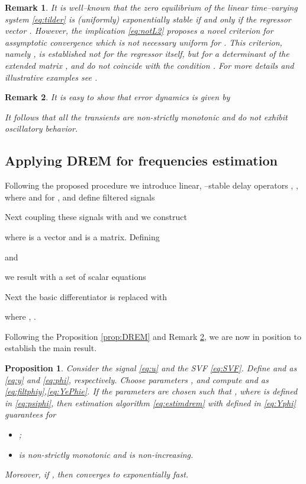 \documentclass[journal, onecolumn]{IEEEtran}
\newtheorem{remark}{Remark}
\newtheorem{prop}{Proposition}
\begin{document}
\begin{remark}
It is well--known \cite{sastry2011adaptive} that the zero equilibrium of the linear time--varying system \eqref{eq:tilder} is (uniformly) exponentially stable if and only if the regressor vector . However, the implication \eqref{eq:notL2} proposes a novel criterion for \emph{assymptotic} convergence which is not necessary uniform for . This criterion, namely , is established not for the regressor  itself, but for a determinant of the extended matrix , and do not coincide with the condition . For more details and illustrative examples see \cite{Aranovskiy2015DREM}.
\end{remark}

\begin{remark} \label{rem:mono}
It is easy to show that error dynamics is given by

It follows that all the transients are \emph{non-strictly monotonic} and do not exhibit oscillatory behavior. 
\end{remark}

\subsection{Applying DREM for frequencies estimation}

Following the proposed procedure we introduce  linear, --stable delay operators ,  , where  and  for , and define  filtered signals

Next coupling these signals with  and  we construct
	
where  is a  vector and  is a  matrix. Defining 

and

we result with a set of  scalar equations

Next the basic differentiator  is replaced with

where , .

Following the Proposition \ref{prop:DREM} and Remark \ref{rem:mono}, we are now in position to establish the main result.

\begin{prop} \label{prop:DREMEstim}
Consider the signal \eqref{eq:u} and the SVF \eqref{eq:SVF}. Define  and  as \eqref{eq:y} and \eqref{eq:phi}, respectively. Choose  parameters ,  and compute  and  as \eqref{eq:filtphiy},\eqref{eq:YePhie}. If the parameters  are chosen such that , where  is defined in \eqref{eq:psiphi}, then  estimation algorithm \eqref{eq:estimdrem} with  defined in \eqref{eq:Yphi} guarantees for 
\begin{itemize}
	\item ;
	\item  is non-strictly monotonic and  is non-increasing.
\end{itemize}
Moreover, if , then  converges to  exponentially fast. \end{prop}
\end{document}
